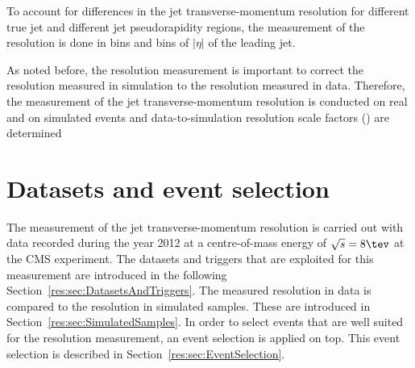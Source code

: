 To account for differences in the jet transverse-momentum resolution for different true jet \pt and different jet pseudorapidity regions, the measurement of the resolution is done in \ptgamma bins and bins of $|\eta|$ of the leading jet.

As noted before, the resolution measurement is important to correct the resolution measured in simulation to the resolution measured in data.
Therefore, the measurement of the jet transverse-momentum resolution is conducted on real and on simulated events and data-to-simulation resolution scale factors (\rhores) are determined
\FloatBarrier
\chapter{Datasets and event selection}

The measurement of the jet transverse-momentum resolution is carried out with \GAMJET data recorded during the year 2012 at a centre-of-mass energy of $\sqrt{s}=8\tev$ at the CMS experiment.
The datasets and triggers that are exploited for this measurement are introduced in the following Section~\ref{res:sec:DatasetsAndTriggers}.
The measured resolution in data is compared to the resolution in simulated samples. These are introduced in Section~\ref{res:sec:SimulatedSamples}.
In order to select \GAMJET events that are well suited for the resolution measurement, an event selection is applied on top.
This event selection is described in Section~\ref{res:sec:EventSelection}.

